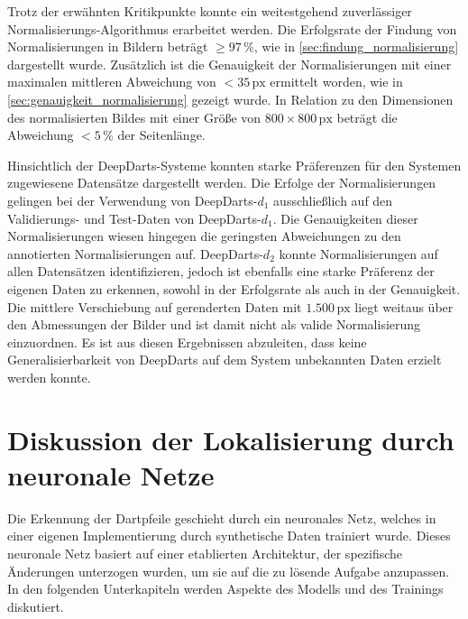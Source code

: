 Trotz der erwähnten Kritikpunkte konnte ein weitestgehend zuverlässiger Normalisierungs-Algorithmus erarbeitet werden. Die Erfolgsrate der Findung von Normalisierungen in Bildern beträgt $\geq 97\,\%$, wie in \autoref{sec:findung_normalisierung} dargestellt wurde. Zusätzlich ist die Genauigkeit der Normalisierungen mit einer maximalen mittleren Abweichung von $<35\,\text{px}$ ermittelt worden, wie in \autoref{sec:genauigkeit_normalisierung} gezeigt wurde. In Relation zu den Dimensionen des normalisierten Bildes mit einer Größe von $800 \times 800\,\text{px}$ beträgt die Abweichung $<5\,\%$ der Seitenlänge.

Hinsichtlich der DeepDarts-Systeme konnten starke Präferenzen für den Systemen zugewiesene Datensätze dargestellt werden. Die Erfolge der Normalisierungen gelingen bei der Verwendung von DeepDarts-$d_1$ ausschließlich auf den Validierungs- und Test-Daten von DeepDarts-$d_1$. Die Genauigkeiten dieser Normalisierungen wiesen hingegen die geringsten Abweichungen zu den annotierten Normalisierungen auf. DeepDarts-$d_2$ konnte Normalisierungen auf allen Datensätzen identifizieren, jedoch ist ebenfalls eine starke Präferenz der eigenen Daten zu erkennen, sowohl in der Erfolgsrate als auch in der Genauigkeit. Die mittlere Verschiebung auf gerenderten Daten mit $1.500\,\text{px}$ liegt weitaus über den Abmessungen der Bilder und ist damit nicht als valide Normalisierung einzuordnen. Es ist aus diesen Ergebnissen abzuleiten, dass keine Generalisierbarkeit von DeepDarts auf dem System unbekannten Daten erzielt werden konnte.



\section{Diskussion der Lokalisierung durch neuronale Netze}
\label{sec:diskussion:ki}

Die Erkennung der Dartpfeile geschieht durch ein neuronales Netz, welches in einer eigenen Implementierung durch synthetische Daten trainiert wurde. Dieses neuronale Netz basiert auf einer etablierten Architektur, der spezifische Änderungen unterzogen wurden, um sie auf die zu lösende Aufgabe anzupassen. In den folgenden Unterkapiteln werden Aspekte des Modells und des Trainings diskutiert.

